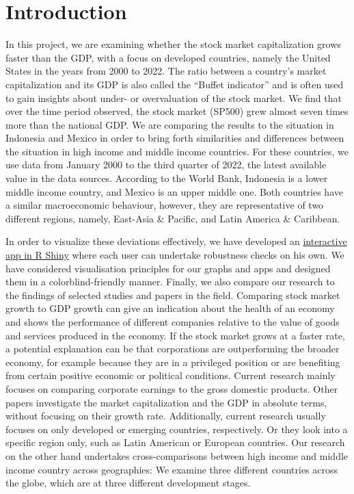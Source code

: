 \documentclass[12pt,a4paper,english]{article}
\begin{document}
\section{Introduction}
\noindent In this project, we are examining whether the stock market capitalization grows faster than the GDP, with a focus on developed countries, namely the United States in the years from 2000 to 2022. The ratio between a country's market capitalization and its GDP is also called the ``Buffet indicator'' and is often used to gain insights about under- or overvaluation of the stock market. We find that over the time period observed, the stock market (SP500) grew almost seven times more than the national GDP. We are comparing the results to the situation in Indonesia and Mexico in order to bring forth similarities and differences between the situation in high income and middle income countries. For these countries, we use data from January 2000 to the third quarter of 2022, the latest available value in the data sources. According to the World Bank, Indonesia is a lower middle income country, and Mexico is an upper middle one. Both countries have a similar macroeconomic behaviour, however, they are representative of two different regions, namely, East-Asia \& Pacific, and Latin America \& Caribbean.


\indent In order to visualize these deviations effectively, we have developed an \href{https://flurinaschneider.shinyapps.io/DTFF22/}{interactive app in R Shiny} where each user can undertake robustness checks on his own. We have considered visualisation principles for our graphs and apps and designed them in a colorblind-friendly manner. Finally, we also compare our research to the findings of selected studies and papers in the field.
\newline
Comparing stock market growth to GDP growth can give an indication about the health of an economy and shows the performance of different companies relative to the value of goods and services produced in the economy. If the stock market grows at a faster rate, a potential explanation can be that corporations are outperforming the broader economy, for example because they are in a privileged position or are benefiting from certain positive economic or political conditions. Current research mainly focuses on comparing corporate earnings to the gross domestic products. Other papers investigate the market capitalization and the GDP in absolute terms, without focusing on their growth rate. Additionally, current research usually focuses on only developed or emerging countries, respectively. Or they look into a specific region only, such as Latin American or European countries.
Our research on the other hand undertakes cross-comparisons between high income and middle income country across geographies: We examine three different countries across the globe, which are at three different development stages. 
\end{document}
